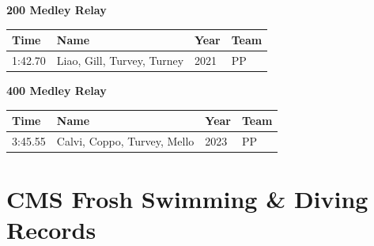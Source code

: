\vspace{1.2em}
\noindent\begin{minipage}[t]{0.98\textwidth}
\centering
\textbf{\textcolor{teamprimary}{200 Medley Relay}}\par
\vspace{0.5em}
\centering
\small
\renewcommand{\arraystretch}{1.0}
\setlength{\tabcolsep}{4pt}
\begin{tabular}{@{}p{2.7cm}p{4.3cm}p{1.6cm}p{2.7cm}@{}}
\toprule
\textbf{Time} & \textbf{Name} & \textbf{Year} & \textbf{Team} \\
\midrule
1:42.70 & Liao, Gill, Turvey, Turney & 2021 & PP \\
\bottomrule
\end{tabular}
\end{minipage}
\vspace{1.2em}
\noindent\begin{minipage}[t]{0.98\textwidth}
\centering
\textbf{\textcolor{teamprimary}{400 Medley Relay}}\par
\vspace{0.5em}
\centering
\small
\renewcommand{\arraystretch}{1.0}
\setlength{\tabcolsep}{4pt}
\begin{tabular}{@{}p{2.7cm}p{4.3cm}p{1.6cm}p{2.7cm}@{}}
\toprule
\textbf{Time} & \textbf{Name} & \textbf{Year} & \textbf{Team} \\
\midrule
3:45.55 & Calvi, Coppo, Turvey, Mello & 2023 & PP \\
\bottomrule
\end{tabular}
\end{minipage}
\vspace{-0.5em}
\clearpage
\section{CMS Frosh Swimming \& Diving Records}
\clearpage
